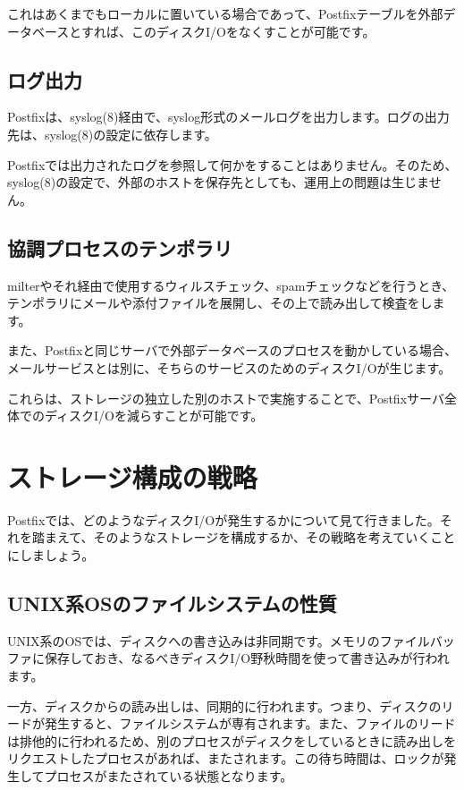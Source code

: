 これはあくまでもローカルに置いている場合であって、Postfixテーブルを外部データベースとすれば、このディスクI/Oをなくすことが可能です。

\subsection{ログ出力}

Postfixは、syslog(8)経由で、syslog形式のメールログを出力します。ログの出力先は、syslog(8)の設定に依存します。

Postfixでは出力されたログを参照して何かをすることはありません。そのため、syslog(8)の設定で、外部のホストを保存先としても、運用上の問題は生じません。

\subsection{協調プロセスのテンポラリ}

milterやそれ経由で使用するウィルスチェック、spamチェックなどを行うとき、テンポラリにメールや添付ファイルを展開し、その上で読み出して検査をします。

また、Postfixと同じサーバで外部データベースのプロセスを動かしている場合、メールサービスとは別に、そちらのサービスのためのディスクI/Oが生じます。

これらは、ストレージの独立した別のホストで実施することで、Postfixサーバ全体でのディスクI/Oを減らすことが可能です。

\section{ストレージ構成の戦略}

Postfixでは、どのようなディスクI/Oが発生するかについて見て行きました。それを踏まえて、そのようなストレージを構成するか、その戦略を考えていくことにしましょう。

\subsection{UNIX系OSのファイルシステムの性質}

UNIX系のOSでは、ディスクへの書き込みは非同期です。メモリのファイルバッファに保存しておき、なるべきディスクI/O野秋時間を使って書き込みが行われます。

一方、ディスクからの読み出しは、同期的に行われます。つまり、ディスクのリードが発生すると、ファイルシステムが専有されます。また、ファイルのリードは排他的に行われるため、別のプロセスがディスクをしているときに読み出しをリクエストしたプロセスがあれば、またされます。この待ち時間は、ロックが発生してプロセスがまたされている状態となります。

